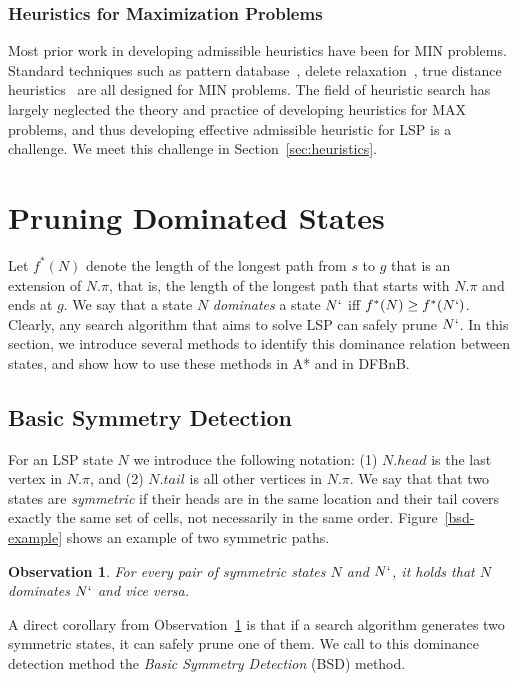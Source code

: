 \documentclass[letterpaper]{article} %
\newcommand\AF[1]{\nb{\textbf{Ariel:}}{red}{#1}}
\newcommand\Roni[1]{\nb{\textbf{Roni:}}{blue}{#1}}
\newtheorem{observation}{Observation}
\begin{document}
\subsubsection{Heuristics for Maximization Problems}
Most prior work in developing admissible heuristics have been for MIN problems. Standard techniques such as pattern database~\cite{culberson1998pattern,felner2004additive,edelkamp2014planning,haslum2007domain},  delete relaxation~\cite{hoffmann2001ff}, true distance heuristics~\cite{sturtevant2009memory,goldenberg2010portal} are all designed for MIN problems. The field of heuristic search has largely neglected the theory and practice of developing heuristics for MAX problems, and thus developing effective admissible heuristic for LSP is a challenge. We meet this challenge in Section~\ref{sec:heuristics}. 





\section{Pruning Dominated States}
\label{sec:prunning}


Let $f^*(N)$ denote the length of the longest path from $s$ to $g$ that is an extension of $N.\pi$,  
that is, the length of the longest path that starts with $N.\pi$ and ends at $g$. 
We say that a state $N$ \emph{dominates} a state $N`$ iff 
$f^*(N)\geq f^*(N`)$. 
Clearly, any search algorithm that aims to solve LSP can safely prune $N`$. In this section, we introduce several methods to identify this dominance relation between states, and show how to use these methods in A* and in DFBnB. 


\subsection{Basic Symmetry Detection}
For an LSP state $N$ we introduce the following notation: 
(1) $N.head$ is the last vertex in $N.\pi$, 
and (2) $N.tail$ is all other vertices in $N.\pi$. 
We say that that two states are {\em symmetric} if their heads are in the same location and their tail covers exactly the same set of cells, not necessarily in the same order. Figure~\ref{bsd-example} shows an example of two symmetric paths. 
\begin{observation}
For every pair of symmetric states $N$ and $N`$, it holds that $N$ dominates $N`$ and vice versa. 
\label{obs:symmetry}
\end{observation}
A direct corollary from Observation~\ref{obs:symmetry} is that if a search algorithm generates two symmetric states, it can safely prune one of them. We call to this dominance detection method the {\em Basic Symmetry Detection} (BSD) method. 
\end{document}
